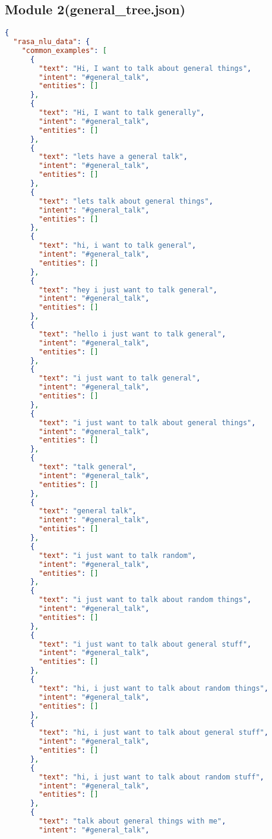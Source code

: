 \begin{appendix}
\subsection{Module 2(general\_tree.json)\label{appen:generalJson}}
\begin{lstlisting}[language=json, firstnumber=1]
{
  "rasa_nlu_data": {
    "common_examples": [
      {
        "text": "Hi, I want to talk about general things",
        "intent": "#general_talk",
        "entities": []
      },
      {
        "text": "Hi, I want to talk generally",
        "intent": "#general_talk",
        "entities": []
      },
      {
        "text": "lets have a general talk",
        "intent": "#general_talk",
        "entities": []
      },
      {
        "text": "lets talk about general things",
        "intent": "#general_talk",
        "entities": []
      },
      {
        "text": "hi, i want to talk general",
        "intent": "#general_talk",
        "entities": []
      },
      {
        "text": "hey i just want to talk general",
        "intent": "#general_talk",
        "entities": []
      },
      {
        "text": "hello i just want to talk general",
        "intent": "#general_talk",
        "entities": []
      },
      {
        "text": "i just want to talk general",
        "intent": "#general_talk",
        "entities": []
      },
      {
        "text": "i just want to talk about general things",
        "intent": "#general_talk",
        "entities": []
      },
      {
        "text": "talk general",
        "intent": "#general_talk",
        "entities": []
      },
      {
        "text": "general talk",
        "intent": "#general_talk",
        "entities": []
      },
      {
        "text": "i just want to talk random",
        "intent": "#general_talk",
        "entities": []
      },
      {
        "text": "i just want to talk about random things",
        "intent": "#general_talk",
        "entities": []
      },
      {
        "text": "i just want to talk about general stuff",
        "intent": "#general_talk",
        "entities": []
      },
      {
        "text": "hi, i just want to talk about random things",
        "intent": "#general_talk",
        "entities": []
      },
      {
        "text": "hi, i just want to talk about general stuff",
        "intent": "#general_talk",
        "entities": []
      },
      {
        "text": "hi, i just want to talk about random stuff",
        "intent": "#general_talk",
        "entities": []
      },
      {
        "text": "talk about general things with me",
        "intent": "#general_talk",

\end{lstlisting}
\end{appendix}
